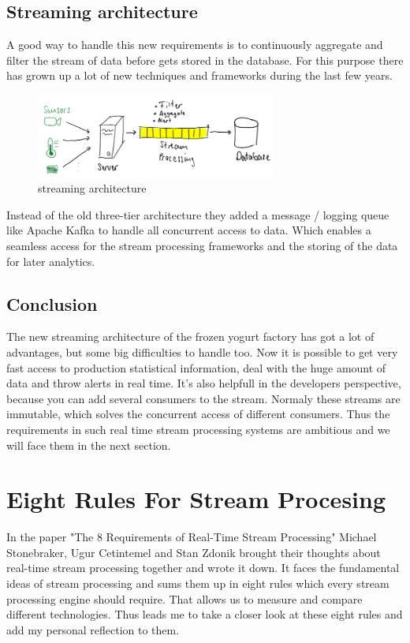 \subsection{Streaming architecture}
A good way to handle this new requirements is to continuously aggregate and filter the stream of data before gets stored in the database.
For this purpose there has grown up a lot of new techniques and frameworks during the last few years.

\begin{figure}[H]
\centering
\captionsetup{justification=centering}
\includegraphics[width=0.7\textwidth]{images/stream.png}
\caption[streaming architecture]{streaming architecture}
\end{figure}

Instead of the old three-tier architecture they added a message / logging queue like Apache Kafka to handle all concurrent access to data.
Which enables a seamless access for the stream processing frameworks and the storing of the data for later analytics.

\subsection{Conclusion}
The new streaming architecture of the frozen yogurt factory has got a lot of advantages, but some big difficulties to handle too.
Now it is possible to get very fast access to production statistical information, deal with the huge amount of data and throw alerts in real time.
It's also helpfull in the developers perspective, because you can add several consumers to the stream.
Normaly these streams are immutable, which solves the concurrent access of different consumers.
Thus the requirements in such real time stream processing systems are ambitious and we will face them in the next section.

\newpage

\section{Eight Rules For Stream Procesing}
In the paper "The 8 Requirements of Real-Time Stream Processing" Michael Stonebraker, Ugur Cetintemel and Stan Zdonik
brought their thoughts about real-time stream processing together and wrote it down. It faces the fundamental ideas of stream processing
and sums them up in eight rules which every stream processing engine should require.
That allows us to measure and compare different technologies.
Thus leads me to take a closer look at these eight rules and add my personal reflection to them.

